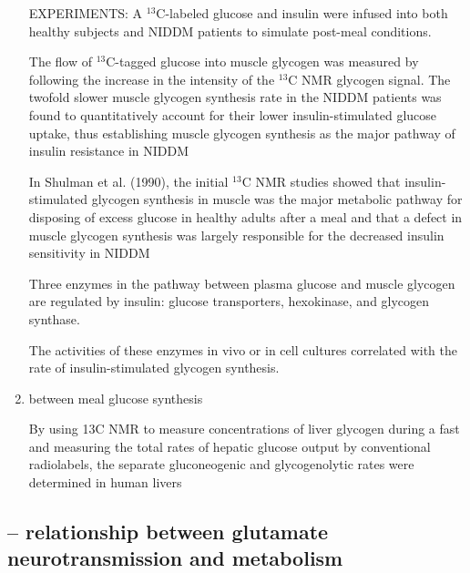 \begin{enumerate}
\begin{mdframed}
\end{mdframed}  

EXPERIMENTS: A $^{13}$C-labeled glucose and insulin were infused into both
healthy subjects and NIDDM patients to simulate post-meal conditions.

The flow of $^{13}$C-tagged glucose into muscle glycogen was measured by
following the increase in the intensity of the $^{13}$C NMR glycogen signal.
The twofold slower muscle glycogen synthesis rate in the NIDDM patients was
found to quantitatively account for their lower insulin-stimulated glucose
uptake, thus establishing muscle glycogen synthesis as the major pathway of
insulin resistance in NIDDM


In Shulman et al. (1990), the initial $^{13}$C NMR studies showed that
insulin-stimulated glycogen synthesis in muscle was the major metabolic pathway
for disposing of excess glucose in healthy adults after a meal and that a defect
in muscle glycogen synthesis was largely responsible for the decreased insulin
sensitivity in NIDDM

  
  Three enzymes in the pathway between plasma glucose and muscle glycogen are
  regulated by insulin: glucose transporters, hexokinase, and glycogen synthase.
  
  The activities of these enzymes in vivo or in cell cultures correlated with
  the rate of insulin-stimulated glycogen synthesis.
  
  \item between meal glucose synthesis
  
  By using 13C NMR to measure concentrations of liver glycogen during a fast and
  measuring the total rates of hepatic glucose output by conventional
  radiolabels, the separate gluconeogenic and glycogenolytic rates were
  determined in human livers
  
  
\end{enumerate}



\subsection{-- relationship between glutamate neurotransmission and metabolism}

